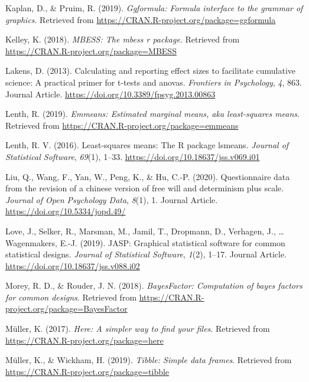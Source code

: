 \documentclass[man]{apa6}
\begin{document}
\leavevmode\hypertarget{ref-R-ggformula}{}%
Kaplan, D., \& Pruim, R. (2019). \emph{Ggformula: Formula interface to the grammar of graphics}. Retrieved from \url{https://CRAN.R-project.org/package=ggformula}

\leavevmode\hypertarget{ref-R-MBESS}{}%
Kelley, K. (2018). \emph{MBESS: The mbess r package}. Retrieved from \url{https://CRAN.R-project.org/package=MBESS}

\leavevmode\hypertarget{ref-Lakens_2013}{}%
Lakens, D. (2013). Calculating and reporting effect sizes to facilitate cumulative science: A practical primer for t-tests and anovas. \emph{Frontiers in Psychology}, \emph{4}, 863. Journal Article. \url{https://doi.org/10.3389/fpsyg.2013.00863}

\leavevmode\hypertarget{ref-R-emmeans}{}%
Lenth, R. (2019). \emph{Emmeans: Estimated marginal means, aka least-squares means}. Retrieved from \url{https://CRAN.R-project.org/package=emmeans}

\leavevmode\hypertarget{ref-R-lsmeans}{}%
Lenth, R. V. (2016). Least-squares means: The R package lsmeans. \emph{Journal of Statistical Software}, \emph{69}(1), 1--33. \url{https://doi.org/10.18637/jss.v069.i01}

\leavevmode\hypertarget{ref-Liu_2020_JOPD}{}%
Liu, Q., Wang, F., Yan, W., Peng, K., \& Hu, C.-P. (2020). Questionnaire data from the revision of a chinese version of free will and determinism plus scale. \emph{Journal of Open Psychology Data}, \emph{8}(1), 1. Journal Article. \url{https://doi.org/10.5334/jopd.49/}

\leavevmode\hypertarget{ref-Love_etal_2019_JASP}{}%
Love, J., Selker, R., Marsman, M., Jamil, T., Dropmann, D., Verhagen, J., \ldots{} Wagenmakers, E.-J. (2019). JASP: Graphical statistical software for common statistical designs. \emph{Journal of Statistical Software}, \emph{1}(2), 1--17. Journal Article. \url{https://doi.org/10.18637/jss.v088.i02}

\leavevmode\hypertarget{ref-R-BayesFactor}{}%
Morey, R. D., \& Rouder, J. N. (2018). \emph{BayesFactor: Computation of bayes factors for common designs}. Retrieved from \url{https://CRAN.R-project.org/package=BayesFactor}

\leavevmode\hypertarget{ref-R-here}{}%
Müller, K. (2017). \emph{Here: A simpler way to find your files}. Retrieved from \url{https://CRAN.R-project.org/package=here}

\leavevmode\hypertarget{ref-R-tibble}{}%
Müller, K., \& Wickham, H. (2019). \emph{Tibble: Simple data frames}. Retrieved from \url{https://CRAN.R-project.org/package=tibble}
\end{document}
